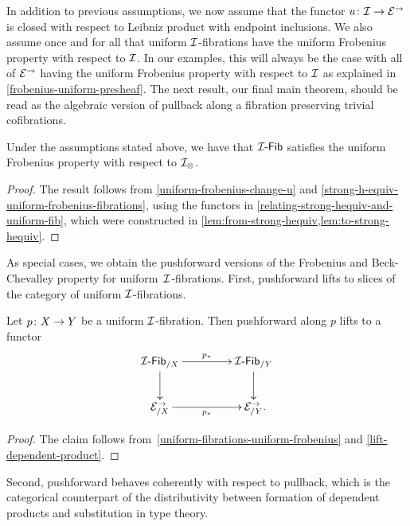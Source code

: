 \documentclass[reqno,10pt,a4paper,oneside,draft]{amsart}
\begin{document}
In addition to previous assumptions, we now assume that the functor $u \co \cal{I} \to \catE^\to$ is closed with respect to Leibniz product with endpoint inclusions.
We also assume once and for all that uniform $\cal{I}$-fibrations have the uniform Frobenius property with respect to $\cal{I}$.
In our examples, this will always be the case with all of $\catE^\to$ having the uniform Frobenius property with respect to $\cal{I}$ as explained in \cref{frobenius-uniform-presheaf}.
The next result, our final main theorem, should be read as the algebraic version of pullback along a fibration preserving trivial cofibrations.

\begin{theorem} \label{uniform-fibrations-uniform-frobenius}
Under the assumptions stated above, we have that $\Fib[\cal{I}] $ satisfies the uniform Frobenius property with respect to $\cal{I}_{\otimes}$.
\end{theorem}

\begin{proof}
The result follows from \cref{uniform-frobenius-change-u} and \cref{strong-h-equiv-uniform-frobenius-fibrations}, using the functors in \cref{relating-strong-hequiv-and-uniform-fib}, which were constructed in \cref{lem:from-strong-hequiv,lem:to-strong-hequiv}.
\end{proof}

As special cases, we obtain the pushforward versions of the Frobenius and Beck-Chevalley property for uniform~$\cal{I}$-fibrations.
First, pushforward lifts to slices of the category of uniform $\cal{I}$-fibrations.

\begin{corollary} \label{uniform-fibrations-frobenius-pushforward}
Let $p \co X \to Y$ be a uniform $\cal{I}$-fibration.
Then pushforward along $p$ lifts to a functor
\[
\xymatrix@C+2em{
  \Fib[\cal{I}]_{/X}
  \ar[r]^{p_*}
  \ar[d]
&
  \Fib[\cal{I}]_{/Y}
  \ar[d]
\\
  \catE_{/X}^\to
  \ar[r]_{p_*}
&
  \catE_{/Y}^\to
\rlap{.}}
\]
\end{corollary}

\begin{proof}
The claim follows from~\cref{uniform-fibrations-uniform-frobenius} and \cref{lift-dependent-product}.
\end{proof}

Second, pushforward behaves coherently with respect to pullback, which is the categorical counterpart of the distributivity between formation of dependent products and substitution in type theory. 
\end{document}
